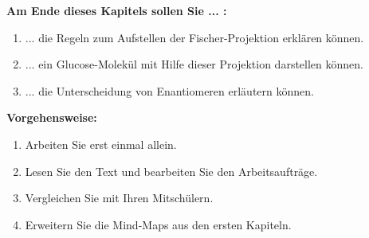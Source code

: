 \documentclass{scrartcl}  %
\begin{document}
		\begin{minipage}{0.7\textwidth}
			\noindent \textbf{Am Ende dieses Kapitels sollen Sie ... :}
			\begin{enumerate}
				\item ... die Regeln zum Aufstellen der Fischer-Projektion erklären können.
				\item ... ein Glucose-Molekül mit Hilfe dieser Projektion darstellen können.
				\item ... die Unterscheidung von Enantiomeren erläutern können.
			\end{enumerate}
			\textbf{Vorgehensweise:}
			\begin{enumerate}
				\item Arbeiten Sie erst einmal allein.
				\item Lesen Sie den Text und bearbeiten Sie den Arbeitsaufträge.
				\item Vergleichen Sie mit Ihren Mitschülern.
				\item Erweitern Sie die Mind-Maps aus den ersten Kapiteln. 
			\end{enumerate}
			
		\end{minipage}
		\hspace{0.1\textwidth}
\end{document}
